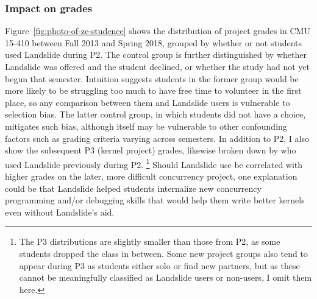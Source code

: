 \subsubsection{Impact on grades}

Figure~\ref{fig:photo-of-ze-studence} shows the distribution of project grades in CMU 15-410
between Fall 2013 and Spring 2018,
grouped by whether or not students used Landslide during P2.
The control group is further distinguished by whether Landslide was offered and the student declined,
or whether the study had not yet begun that semester.
Intuition suggests students in the former  group would be more likely
to be struggling too much to have free time to volunteer in the first place,
so any comparison between them and Landslide users is vulnerable to selection bias.
The latter control group, in which students did not have a choice, mitigates such bias,
although itself may be vulnerable to other confounding factors such as grading criteria varying across semesters.
%
In addition to P2, I also show the subsequent P3 (kernel project) grades,
likewise broken down by who used Landslide previously during P2.%
\footnote{The P3 distributions are slightly smaller than those from P2,
as some students dropped the class in between.
Some new project groups also tend to appear during P3 as students either solo or find new partners,
but as these cannot be meaningfully classified as Landslide users or non-users,
I omit them here.
}
Should Landslide use be correlated with higher grades on the later, more difficult concurrency project,
one explanation could be that Landslide helped students
internalize new concurrency programming and/or debugging skills
that would help them write better kernels even without Landslide's aid.

